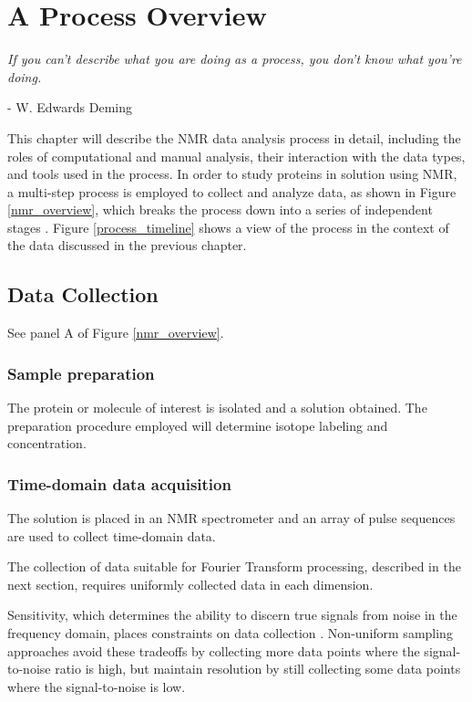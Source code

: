 \chapter{A Process Overview}

\begin{center}
  \textit{If you can't describe what you are doing as a process, you don't 
          know what you're doing.}

 - W. Edwards Deming
\end{center}

This chapter will describe the NMR data analysis process in detail,
including the roles of computational and manual analysis, their interaction
with the data types, and tools used in the process.
In order to study proteins in solution using NMR, a multi-step process is 
employed to collect and analyze data, as shown in 
Figure \ref{nmr_overview}, which breaks the process down into a series of 
independent stages \cite{guerry2011automated}.
Figure \ref{process_timeline} shows a view of the process in the context
of the data discussed in the previous chapter.



\section{Data Collection}

See panel A of Figure \ref{nmr_overview}.

\subsection*{Sample preparation}
The protein or molecule of interest is isolated and a solution 
obtained.  The preparation procedure employed will determine isotope labeling
and concentration.

\subsection*{Time-domain data acquisition}
The solution is placed in an NMR spectrometer and an array of pulse sequences
are used to collect time-domain data.

The collection of data suitable for Fourier Transform processing, described
in the next section, requires uniformly collected data in each dimension.

Sensitivity, which determines the ability to discern true signals
from noise in the frequency domain, places constraints on data collection
\cite{rovnyak2004accelerated}.  Non-uniform sampling approaches 
\cite{maciejewski2011random} avoid these tradeoffs by collecting more data
points where the signal-to-noise ratio is high, but maintain resolution by
still collecting some data points where the signal-to-noise is low.



